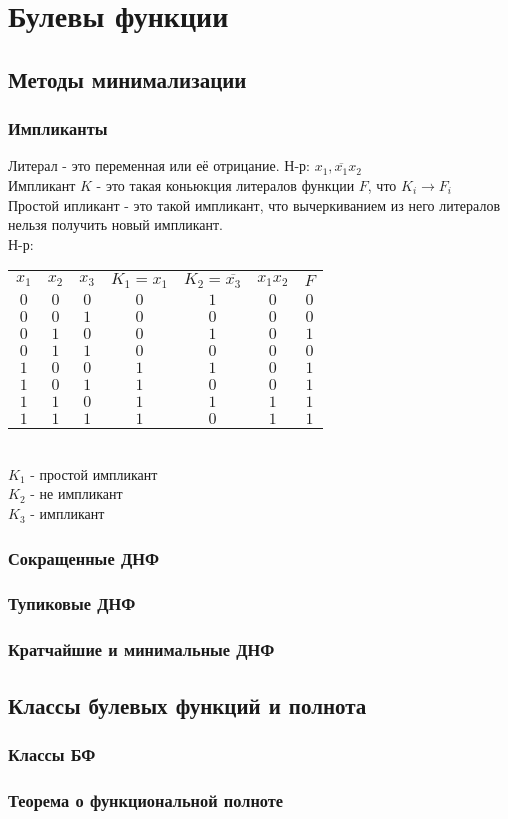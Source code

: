 \chapter{Булевы функции}

\section{Методы минимализации}
\subsection{Импликанты}
Литерал - это переменная или её отрицание. Н-р: $x_1, \overline{x_1}x_2$\\
Импликант $K$ - это такая коньюкция литералов функции $F$, что $K_i \rightarrow F_i$\\
Простой ипликант - это такой импликант, что вычеркиванием из него литералов нельзя получить новый импликант.\\
Н-р:\\
\begin{tabular}{ccccccc}
	$x_1$ & $x_2$ & $x_3$ & $K_1 = x_1$ & $K_2 = \overline{x_3}$ & $x_1x_2$ & $F$\\
	$0$ & $0$ & $0$ & $0$ & $1$ & $0$ & $0$\\
	$0$ & $0$ & $1$ & $0$ & $0$ & $0$ & $0$\\
	$0$ & $1$ & $0$ & $0$ & $1$ & $0$ & $1$\\
	$0$ & $1$ & $1$ & $0$ & $0$ & $0$ & $0$\\
	$1$ & $0$ & $0$ & $1$ & $1$ & $0$ & $1$\\
	$1$ & $0$ & $1$ & $1$ & $0$ & $0$ & $1$\\
	$1$ & $1$ & $0$ & $1$ & $1$ & $1$ & $1$\\
	$1$ & $1$ & $1$ & $1$ & $0$ & $1$ & $1$\\
\end{tabular}\\
$K_1$ - простой импликант\\
$K_2$ - не импликант\\
$K_3$ - импликант\\


\subsection{Сокращенные ДНФ}
\subsection{Тупиковые ДНФ}
\subsection{Кратчайшие и минимальные ДНФ}

\section{Классы булевых функций и полнота}
\subsection{Классы БФ}
\subsection{Теорема о функциональной полноте} 
